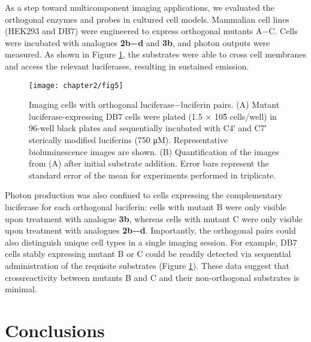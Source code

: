 As a step
toward multicomponent imaging applications, we evaluated the
orthogonal enzymes and probes in cultured cell models.
Mammalian cell lines (HEK293 and DB7) were engineered
to express orthogonal mutants A−C. %
Cells
were incubated with analogues \textbf{2b−d} and \textbf{3b}, and photon
outputs were measured. As shown in Figure \ref{fig:in_vitro}, the substrates
were able to cross cell membranes and access the relevant
luciferases, resulting in sustained emission.
\begin{figure}[htbp]
\texttt{[image: chapter2/fig5]}
\centering
\caption[Imaging cells with orthogonal luciferase−luciferin pairs]{Imaging cells with orthogonal luciferase−luciferin pairs. (A) Mutant luciferase-expressing DB7 cells were plated (1.5 × 10\^{5} cells/well) in
96-well black plates and sequentially incubated with C4′ and C7′ sterically modified luciferins (750 μM). Representative bioluminescence images are
shown. (B) Quantification of the images from (A) after initial substrate addition. Error bars represent the standard error of the mean for experiments
performed in triplicate.}
  \label{fig:in_vitro}
\end{figure}
Photon production
was also confined to cells expressing the complementary
luciferase for each orthogonal luciferin: cells with mutant B
were only visible upon treatment with analogue \textbf{3b}, whereas
cells with mutant C were only visible upon treatment with analogues \textbf{2b−d}.
Importantly, the
orthogonal pairs could also distinguish unique cell types in a
single imaging session. For example, DB7 cells stably expressing
mutant B or C could be readily detected via sequential
administration of the requisite substrates (Figure \ref{fig:in_vitro}). 
These data suggest that crossreactivity
between mutants B and C and their non-orthogonal
substrates is minimal. 

\section{Conclusions}

